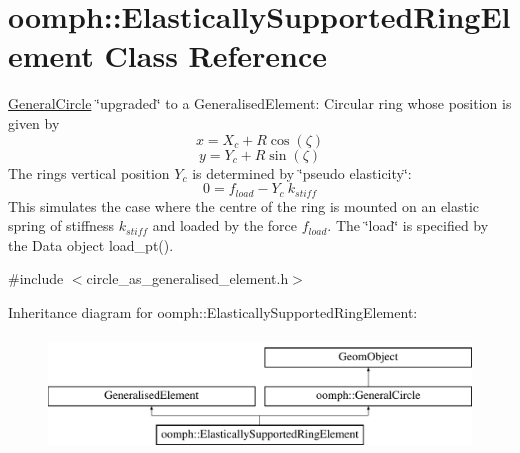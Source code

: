 \hypertarget{classoomph_1_1ElasticallySupportedRingElement}{}\section{oomph\+:\+:Elastically\+Supported\+Ring\+Element Class Reference}
\label{classoomph_1_1ElasticallySupportedRingElement}


\hyperlink{classoomph_1_1GeneralCircle}{General\+Circle} \char`\"{}upgraded\char`\"{} to a Generalised\+Element\+: Circular ring whose position is given by \[ x = X_c + R \cos(\zeta) \] \[ y = Y_c + R \sin(\zeta) \] The ring\textquotesingle{}s vertical position $ Y_c $ is determined by \char`\"{}pseudo elasticity\char`\"{}\+: \[ 0 = f_{load} - Y_c \ k_{stiff} \] This simulates the case where the centre of the ring is mounted on an elastic spring of stiffness $ k_{stiff} $ and loaded by the force $ f_{load}. $ The \char`\"{}load\char`\"{} is specified by the Data object {\ttfamily load\+\_\+pt()}.  




{\ttfamily \#include $<$circle\+\_\+as\+\_\+generalised\+\_\+element.\+h$>$}

Inheritance diagram for oomph\+:\+:Elastically\+Supported\+Ring\+Element\+:\begin{figure}[H]
\begin{center}
\leavevmode
\includegraphics[height=3.000000cm]{classoomph_1_1ElasticallySupportedRingElement}
\end{center}
\end{figure}
